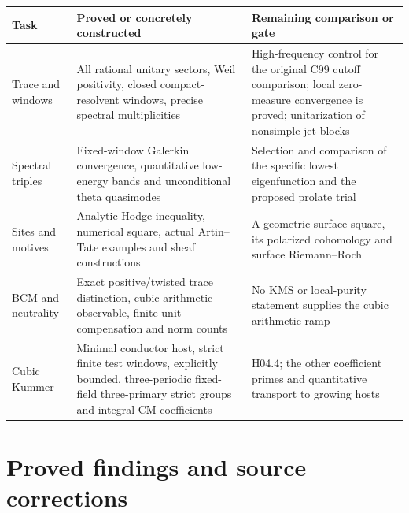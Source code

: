 \documentclass[11pt,a4paper]{article}
\theoremstyle{definition}
\theoremstyle{remark}
\begin{document}
\begin{center}
\begin{tabular}{p{}p{}p{}}
\toprule
Task & Proved or concretely constructed & Remaining comparison or gate\\
\midrule
Trace and windows & All rational unitary sectors, Weil positivity,
closed compact-resolvent windows, precise spectral multiplicities &
High-frequency control for the original C99 cutoff comparison;
local zero-measure convergence is proved; unitarization of nonsimple jet blocks\\
Spectral triples & Fixed-window Galerkin convergence, quantitative
low-energy bands and unconditional theta quasimodes & Selection and comparison of
the specific lowest eigenfunction and the proposed prolate trial\\
Sites and motives & Analytic Hodge inequality, numerical square,
actual Artin--Tate examples and sheaf constructions & A geometric
surface square, its polarized cohomology and surface Riemann--Roch\\
BCM and neutrality & Exact positive/twisted trace distinction, cubic
arithmetic observable, finite unit compensation and norm counts &
No KMS or local-purity statement supplies the cubic arithmetic ramp\\
Cubic Kummer & Minimal conductor host, strict finite test windows,
explicitly bounded, three-periodic fixed-field three-primary strict groups and integral CM
coefficients & H04.4; the other coefficient primes and quantitative
transport to growing hosts\\
\bottomrule
\end{tabular}
\end{center}

\part{Proved findings and source corrections}





















\end{document}
